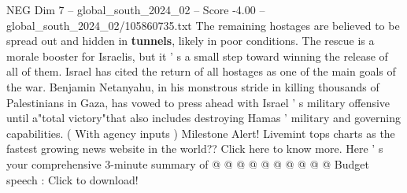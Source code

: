 \begin{textsample}{NEG Dim 7 – global\_south\_2024\_02 – Score -4.00 – global\_south\_2024\_02/105860735.txt}
The remaining hostages are believed to be spread out and hidden in \textbf{tunnels}, likely in poor conditions.
The rescue is a morale booster for Israelis, but it ' s a small step toward winning the release of all of them.
Israel has cited the return of all hostages as one of the main goals of the war.
Benjamin Netanyahu, in his monstrous stride in killing thousands of Palestinians in Gaza, has vowed to press ahead with Israel ' s military offensive until a"total victory"that also includes destroying Hamas ' military and governing capabilities. ( With agency inputs ) Milestone Alert!
Livemint tops charts as the fastest growing news website in the world??
Click here to know more.
Here ' s your comprehensive 3-minute summary of @ @ @ @ @ @ @ @ @ @ Budget speech : Click to download!

\end{textsample}
